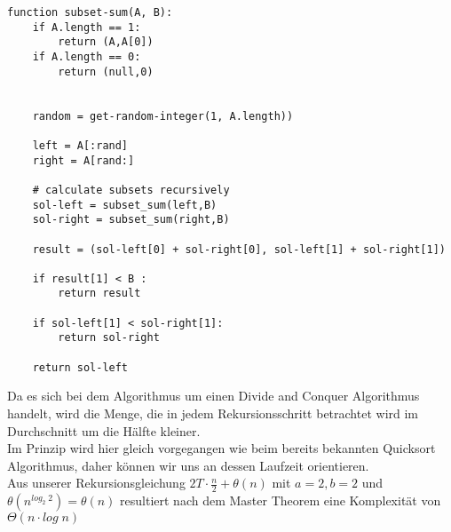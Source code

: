 \documentclass[a4paper]{scrartcl}
\begin{document}
\begin{lstlisting}
function subset-sum(A, B):
	if A.length == 1:
		return (A,A[0])
	if A.length == 0:
		return (null,0)


	random = get-random-integer(1, A.length))

	left = A[:rand]
	right = A[rand:]

	# calculate subsets recursively
	sol-left = subset_sum(left,B)
	sol-right = subset_sum(right,B)

	result = (sol-left[0] + sol-right[0], sol-left[1] + sol-right[1])

	if result[1] < B :	
		return result

	if sol-left[1] < sol-right[1]:
		return sol-right

	return sol-left
\end{lstlisting}

Da es sich bei dem Algorithmus um einen Divide and Conquer Algorithmus handelt, wird die Menge, die in jedem Rekursionsschritt betrachtet wird im Durchschnitt um die Hälfte kleiner.\\
Im Prinzip wird hier gleich vorgegangen wie beim bereits bekannten Quicksort Algorithmus, daher können wir uns an dessen Laufzeit orientieren.\\
Aus unserer Rekursionsgleichung 
$
2T\cdot \frac{n}{2} + \theta (n)$ mit $a=2, b=2$ und $\theta(n^{log_2\;2}) = \theta (n)$ resultiert nach dem Master Theorem eine Komplexität von $\Theta (n \cdot log\;n)$
\end{document}
